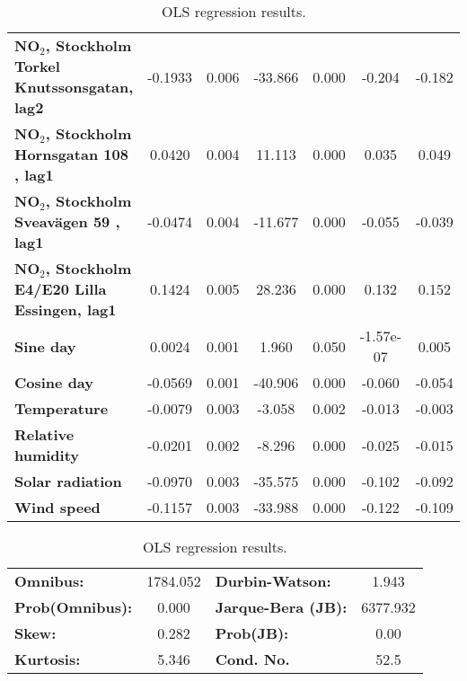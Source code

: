 \begin{landscape}
\begin{table}
\begin{center}
\begin{tabular}{lcccccc}
\textbf{NO$_2$, Stockholm Torkel Knutssonsgatan, lag2} &      -0.1933  &        0.006     &   -33.866  &         0.000        &       -0.204    &       -0.182     \\
\textbf{NO$_2$, Stockholm Hornsgatan 108 , lag1}       &       0.0420  &        0.004     &    11.113  &         0.000        &        0.035    &        0.049     \\
\textbf{NO$_2$, Stockholm Sveavägen 59 , lag1}         &      -0.0474  &        0.004     &   -11.677  &         0.000        &       -0.055    &       -0.039     \\
\textbf{NO$_2$, Stockholm E4/E20 Lilla Essingen, lag1} &       0.1424  &        0.005     &    28.236  &         0.000        &        0.132    &        0.152     \\
\textbf{Sine day}                                         &       0.0024  &        0.001     &     1.960  &         0.050        &    -1.57e-07    &        0.005     \\
\textbf{Cosine day}                                       &      -0.0569  &        0.001     &   -40.906  &         0.000        &       -0.060    &       -0.054     \\
\textbf{Temperature}                                      &      -0.0079  &        0.003     &    -3.058  &         0.002        &       -0.013    &       -0.003     \\
\textbf{Relative humidity}                                &      -0.0201  &        0.002     &    -8.296  &         0.000        &       -0.025    &       -0.015     \\
\textbf{Solar radiation}                                  &      -0.0970  &        0.003     &   -35.575  &         0.000        &       -0.102    &       -0.092     \\
\textbf{Wind speed}                                       &      -0.1157  &        0.003     &   -33.988  &         0.000        &       -0.122    &       -0.109     \\
\bottomrule
\end{tabular}
\begin{tabular}{lclc}
\textbf{Omnibus:}       & 1784.052 & \textbf{  Durbin-Watson:     } &    1.943  \\
\textbf{Prob(Omnibus):} &   0.000  & \textbf{  Jarque-Bera (JB):  } & 6377.932  \\
\textbf{Skew:}          &   0.282  & \textbf{  Prob(JB):          } &     0.00  \\
\textbf{Kurtosis:}      &   5.346  & \textbf{  Cond. No.          } &     52.5  \\
\bottomrule
\end{tabular}
\caption{OLS regression results.}
\label{tab:OLS_table}
\end{center}
\end{table}
\end{landscape}


